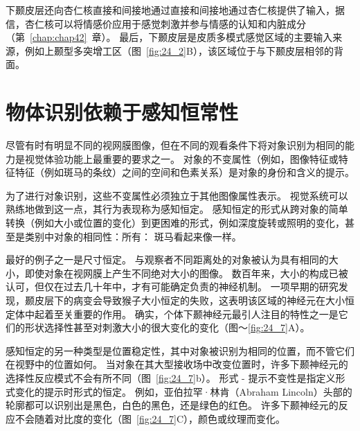 下颞皮层还向杏仁核直接和间接地通过直接和间接地通过杏仁核提供了输入，据信，杏仁核可以将情感价应用于感觉刺激并参与情感的认知和内脏成分（第~\ref{chap:chap42}~章）。
最后，下颞皮层是皮质多模式感觉区域的主要输入来源，例如上颞型多突增工区（图~\ref{fig:24_2}B），该区域位于与下颞皮层相邻的背面。



\section{物体识别依赖于感知恒常性}

尽管有时有明显不同的视网膜图像，但在不同的观看条件下将对象识别为相同的能力是视觉体验功能上最重要的要求之一。
对象的不变属性（例如，图像特征或特征特征（例如斑马的条纹）之间的空间和色素关系）是对象的身份和含义的提示。


为了进行对象识别，这些不变属性必须独立于其他图像属性表示。
视觉系统可以熟练地做到这一点，其行为表现称为感知恒定。
感知恒定的形式从跨对象的简单转换（例如大小或位置的变化）到更困难的形式，例如深度旋转或照明的变化，甚至是类别中对象的相同性：所有： 斑马看起来像一样。


最好的例子之一是尺寸恒定。
与观察者不同距离处的对象被认为具有相同的大小，即使对象在视网膜上产生不同绝对大小的图像。
数百年来，大小的构成已被认可，但仅在过去几十年中，才有可能确定负责的神经机制。
一项早期的研究发现，颞皮层下的病变会导致猴子大小恒定的失败，这表明该区域的神经元在大小恒定体中起着至关重要的作用。
确实，个体下颞神经元最引人注目的特性之一是它们的形状选择性甚至对刺激大小的很大变化的变化（图～\ref{fig:24_7}A）。


感知恒定的另一种类型是位置稳定性，其中对象被识别为相同的位置，而不管它们在视野中的位置如何。
当对象在其大型接收场中改变位置时，许多下颞神经元的选择性反应模式不会有所不同（图~\ref{fig:24_7}b）。
形式 - 提示不变性是指定义形式变化的提示时形式的恒定。
例如，亚伯拉罕·林肯（Abraham Lincoln）头部的轮廓都可以识别出是黑色，白色的黑色，还是绿色的红色。 
许多下颞神经元的反应不会随着对比度的变化（图~\ref{fig:24_7}C），颜色或纹理而变化。


